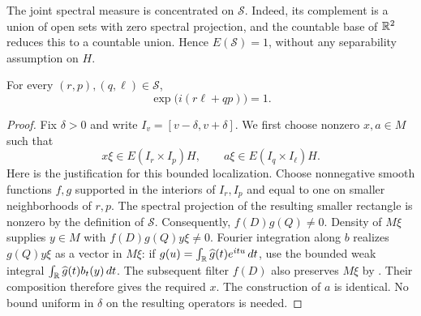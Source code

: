 The joint spectral measure is concentrated on $\mathcal S$. Indeed, its
complement is a union of open sets with zero spectral projection, and the
countable base of $\mathbb R^2$ reduces this to a countable union. Hence
$E(\mathcal S)=1$, without any separability assumption on $H$.

\begin{lemma}
\label{spec:pairing}
For every $(r,p),(q,\ell)\in\mathcal S$,
\begin{equation}
 \exp\bigl(i(r\ell+qp)\bigr)=1.
 \label{eq:spectral-pairing}
\end{equation}
\end{lemma}

\begin{proof}
Fix $\delta>0$ and write $I_v=[v-\delta,v+\delta]$. We first choose nonzero
$x,a\in M$ such that
\[
 x\xi\in E(I_r\times I_p)H,
 \qquad
 a\xi\in E(I_q\times I_\ell)H.
\]
Here is the justification for this bounded localization. Choose nonnegative
smooth functions $f,g$ supported in the interiors of $I_r,I_p$ and equal
to one on smaller neighborhoods of $r,p$. The spectral projection of the
resulting smaller rectangle is nonzero by the definition of $\mathcal S$.
Consequently, $f(D)g(Q)\neq0$. Density of $M\xi$ supplies $y\in M$ with
$f(D)g(Q)y\xi\neq0$. Fourier integration along $b$ realizes $g(Q)y\xi$ as
a vector in $M\xi$: if $g(u)=\int_{\mathbb R}\widehat g(t)e^{itu}\,dt$, use the
bounded weak integral $\int_{\mathbb R}\widehat g(t)b_t(y)\,dt$. The subsequent
filter $f(D)$ also preserves $M\xi$ by . Their
composition therefore gives the required $x$. The construction of $a$ is
identical. No bound uniform in $\delta$ on the resulting operators is
needed.


\end{proof}
